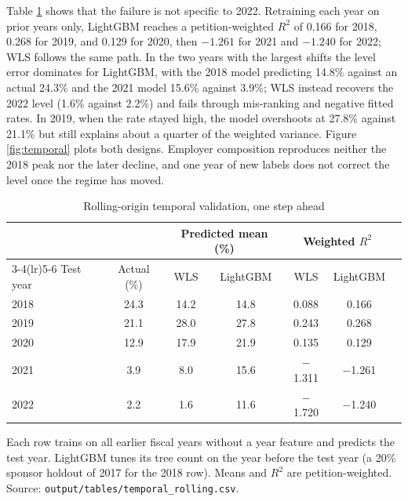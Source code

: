 \documentclass[9pt,twoside]{pnas-new}
\begin{document}
Table \ref{tab:rolling} shows that the failure is not specific to 2022. Retraining each year on prior years only, LightGBM reaches a petition-weighted $R^2$ of 0.166 for 2018, 0.268 for 2019, and 0.129 for 2020, then $-1.261$ for 2021 and $-1.240$ for 2022; WLS follows the same path. In the two years with the largest shifts the level error dominates for LightGBM, with the 2018 model predicting 14.8\% against an actual 24.3\% and the 2021 model 15.6\% against 3.9\%; WLS instead recovers the 2022 level (1.6\% against 2.2\%) and fails through mis-ranking and negative fitted rates. In 2019, when the rate stayed high, the model overshoots at 27.8\% against 21.1\% but still explains about a quarter of the weighted variance. Figure \ref{fig:temporal} plots both designs. Employer composition reproduces neither the 2018 peak nor the later decline, and one year of new labels does not correct the level once the regime has moved.

\begin{table}[!htb]
\centering
\caption{Rolling-origin temporal validation, one step ahead}
\label{tab:rolling}
\begin{minipage}{0.98\linewidth}
\centering
\begin{tabular}{lcccccc}
\toprule
 & & \multicolumn{2}{c}{Predicted mean (\%)} & \multicolumn{2}{c}{Weighted $R^2$} \\
\cmidrule(lr){3-4}\cmidrule(lr){5-6}
Test year & Actual (\%) & WLS & LightGBM & WLS & LightGBM \\
\midrule
2018 & 24.3 & 14.2 & 14.8 & 0.088 & 0.166 \\
2019 & 21.1 & 28.0 & 27.8 & 0.243 & 0.268 \\
2020 & 12.9 & 17.9 & 21.9 & 0.135 & 0.129 \\
2021 & 3.9 & 8.0 & 15.6 & $-$1.311 & $-$1.261 \\
2022 & 2.2 & 1.6 & 11.6 & $-$1.720 & $-$1.240 \\
\bottomrule
\end{tabular}
\par\smallskip
{\scriptsize Each row trains on all earlier fiscal years without a year feature and predicts the test year. LightGBM tunes its tree count on the year before the test year (a 20\% sponsor holdout of 2017 for the 2018 row). Means and $R^2$ are petition-weighted. Source: \texttt{output/tables/temporal\_rolling.csv}.\par}
\end{minipage}
\end{table}
\end{document}
